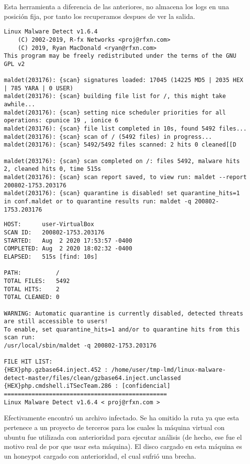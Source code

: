 \documentclass[11pt]{utalcaDoc}
\begin{document}
Esta herramienta a diferencia de las anteriores, no almacena los logs en una posición fija, por tanto los recuperamos despues de ver la salida.

\begin{verbatim}
Linux Malware Detect v1.6.4
	(C) 2002-2019, R-fx Networks <proj@rfxn.com>
	(C) 2019, Ryan MacDonald <ryan@rfxn.com>
This program may be freely redistributed under the terms of the GNU GPL v2

maldet(203176): {scan} signatures loaded: 17045 (14225 MD5 | 2035 HEX | 785 YARA | 0 USER)
maldet(203176): {scan} building file list for /, this might take awhile...
maldet(203176): {scan} setting nice scheduler priorities for all operations: cpunice 19 , ionice 6
maldet(203176): {scan} file list completed in 10s, found 5492 files...
maldet(203176): {scan} scan of / (5492 files) in progress...
maldet(203176): {scan} 5492/5492 files scanned: 2 hits 0 cleaned[[D

maldet(203176): {scan} scan completed on /: files 5492, malware hits 2, cleaned hits 0, time 515s
maldet(203176): {scan} scan report saved, to view run: maldet --report 200802-1753.203176
maldet(203176): {scan} quarantine is disabled! set quarantine_hits=1 in conf.maldet or to quarantine results run: maldet -q 200802-1753.203176
\end{verbatim}


\begin{verbatim}
HOST:      user-VirtualBox
SCAN ID:   200802-1753.203176
STARTED:   Aug  2 2020 17:53:57 -0400
COMPLETED: Aug  2 2020 18:02:32 -0400
ELAPSED:   515s [find: 10s]

PATH:          /
TOTAL FILES:   5492
TOTAL HITS:    2
TOTAL CLEANED: 0

WARNING: Automatic quarantine is currently disabled, detected threats are still accessible to users!
To enable, set quarantine_hits=1 and/or to quarantine hits from this scan run:
/usr/local/sbin/maldet -q 200802-1753.203176

FILE HIT LIST:
{HEX}php.gzbase64.inject.452 : /home/user/tmp-lmd/linux-malware-detect-master/files/clean/gzbase64.inject.unclassed
{HEX}php.cmdshell.iTSecTeam.286 : [confidencial]
===============================================
Linux Malware Detect v1.6.4 < proj@rfxn.com >
\end{verbatim}

Efectivamente encontró un archivo infectado. Se ha omitido la ruta ya que esta pertenece a un proyecto de terceros para los cuales la máquina virtual con ubuntu fue utilizada con anterioridad para ejecutar análisis (de hecho, ese fue el motivo real de por que usar esta máquina). El disco cargado en esta máquina es un honeypot cargado con anterioridad, el cual sufrió una brecha.
\end{document}
